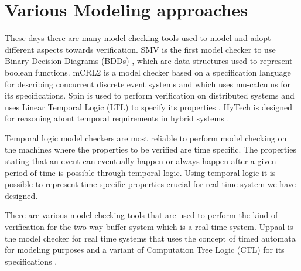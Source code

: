 \documentclass[letterpaper]{article}
\begin{document}
\section{Various Modeling approaches}
\label{2}
These days there are many model checking tools used to model and adopt different aspects towards verification. SMV is the first model checker to use Binary Decision Diagrams (BDDs) \cite{REF10}, which are data structures used to represent boolean functions. mCRL2 \cite{REF8} is a model checker based on a specification language for describing concurrent discrete event systems and which uses mu-calculus \cite{REF9} for its specifications. Spin is used to perform verification on distributed systems and uses Linear Temporal Logic (LTL) to specify its properties \cite{REF11}. HyTech is designed for reasoning about temporal requirements in hybrid systems \cite{REF12}.
 \par Temporal logic model checkers are most reliable to perform model checking on the machines where the properties to be verified are time specific. The properties stating that an event can eventually happen or always happen after a given period of time is possible through temporal logic. Using temporal logic it is possible to represent time specific properties crucial for real time system we have designed. 
\par There are various model checking tools that are used to perform the kind of verification for the two way buffer system which is a  real time system. Uppaal is the model checker for real time systems that uses the concept of timed automata for modeling purposes and a variant of Computation Tree Logic (CTL) for its specifications \cite{REF7}.
\end{document}
